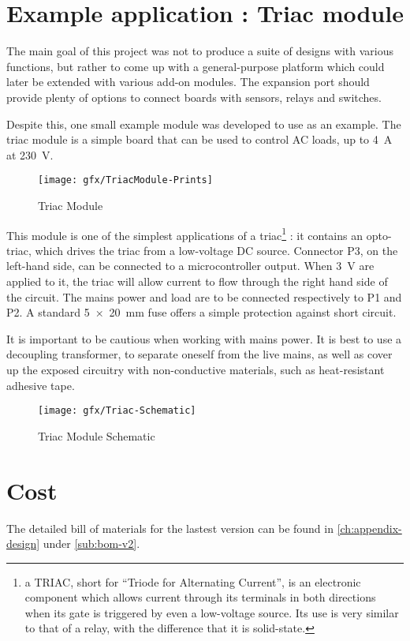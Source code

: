\section{Example application : Triac module}

The main goal of this project was not to produce a suite of designs with various
functions, but rather to come up with a general-purpose platform which could
later be extended with various add-on modules. The expansion port should provide
plenty of options to connect boards with sensors, relays and switches.

Despite this, one small example module was developed to use as an example. The
triac module is a simple board that can be used to control AC loads, up to
\SI{4}{A} at \SI{230}{V}.

\begin{figure}[htb]
  \begin{center}
    \texttt{[image: gfx/TriacModule-Prints]}
  \end{center}
  \caption{Triac Module}
  \label{fig:triac-module}
\end{figure}

This module is one of the simplest applications of a triac\footnote{a TRIAC,
short for ``Triode for Alternating Current'', is an electronic component which
allows current through its terminals in both directions when its gate is
triggered by even a low-voltage source. Its use is very similar to that of
a relay, with the difference that it is solid-state.}
: it contains an opto-triac, which drives the triac from a low-voltage DC
source. Connector P3, on the left-hand side, can be connected to
a microcontroller output. When \SI{3}{V} are applied to it, the triac will allow
current to flow through the right hand side of the circuit. The mains power and
load are to be connected respectively to P1 and P2. A standard \SI{5x20}{mm}
fuse offers a simple protection against short circuit.

It is important to be cautious when working with mains power. It is best to use
a decoupling transformer, to separate oneself from the live mains, as well as
cover up the exposed circuitry with non-conductive materials, such as
heat-resistant adhesive tape.

\begin{figure}[htb]
  \begin{center}
    \texttt{[image: gfx/Triac-Schematic]}
  \end{center}
  \caption{Triac Module Schematic}
  \label{fig:triac-schematic}
\end{figure}

\section{Cost}\label{sec:cost}

The detailed bill of materials for the lastest version can be found in
\autoref{ch:appendix-design} under \autoref{sub:bom-v2}.
